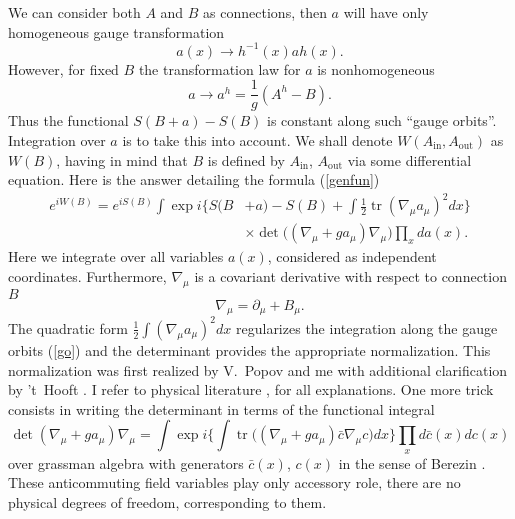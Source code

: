 \documentclass[12pt]{article}
\DeclareMathOperator{\tr}{tr}
\begin{document}
	We can consider both
    $ A $
	and
    $ B $
	as connections, then 
    $ a $
	will have only homogeneous gauge transformation
\begin{equation*}
    a(x) \to h^{-1}(x) a h(x) .
\end{equation*}
	However, for fixed 
    $ B $
	the transformation law for
    $ a $
	is nonhomogeneous
\begin{equation}
\label{go}
    a \to a^{h} = \frac{1}{g} (A^{h} - B) .
\end{equation}
	Thus the functional
    $ S(B+a) - S(B)$
	is constant along such ``gauge orbits''.
	Integration over
    $ a $
	is to take this into account.
	We shall denote
    $ W(A_{\text{in}}, A_{\text{out}}) $
	as
    $ W(B) $,
	having in mind that 
    $ B $
	is defined by
    $ A_{\text{in}} $,
    $ A_{\text{out}} $
	via some differential equation.
	Here is the answer detailing the formula
(\ref{genfun})
\begin{equation}
\label{idet}
\begin{split}
    e^{i W(B)} = e^{i S(B)} \int \exp i	\bigl\{ S(B&+a)-S(B) 
	    + \int \frac{1}{2} \tr (\nabla_{\mu} a_{\mu})^{2}dx\bigr\} \\
	& \times \det \bigl((\nabla_{\mu}+ g a_{\mu}) 
	    \nabla_{\mu}\bigr) \prod_{x} d a(x) .
\end{split}
\end{equation}
	Here we integrate over all variables
    $ a(x) $,
	considered as independent coordinates.
	Furthermore,
    $ \nabla_{\mu} $
	is a covariant derivative with respect to connection
    $ B $
\begin{equation*}
    \nabla_{\mu} = \partial_{\mu} + B_{\mu} .
\end{equation*}
	The quadratic form
    $ \frac{1}{2} \int (\nabla_{\mu} a_{\mu})^{2} dx $
	regularizes the integration along the gauge orbits
(\ref{go})
	and the determinant provides the appropriate normalization.
	This normalization was first realized by V.~Popov and me
\cite{FP}
	with additional clarification by 't~Hooft
\cite{Hooft}.
	I refer to physical literature
\cite{FS}, \cite{Peskin}
	for all explanations.
	One more trick consists in writing the determinant in terms 
	of the functional integral
\begin{equation*}
    \det (\nabla_{\mu} + g a_{\mu}) \nabla_{\mu} = \int
	\exp i \bigl\{ \int \tr \bigl( (\nabla_{\mu} + g a_{\mu})
	    \bar{c} \nabla_{\mu} c \bigr) dx \bigr\}
	\prod_{x} d \bar{c}(x) d c(x)
\end{equation*}
	over grassman algebra with generators
    $ \bar{c}(x) $, $ c(x) $
	in the sense of Berezin
\cite{Berezin}.
	These anticommuting field variables play only accessory role,
	there are no physical degrees of freedom, corresponding
	to them.
\end{document}
